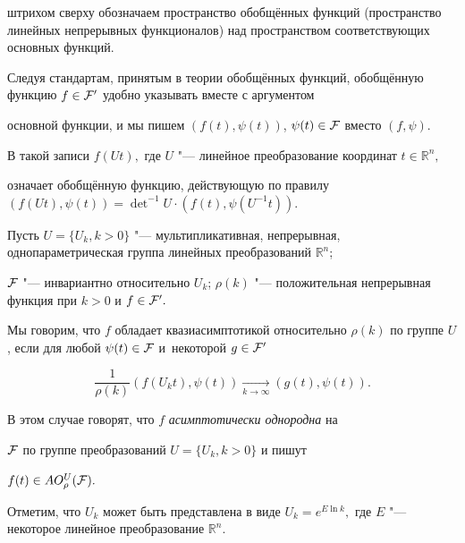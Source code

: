 штрихом сверху обозначаем пространство обобщённых функций (пространство линейных непрерывных функционалов) над пространством соответствующих основных функций.

Следуя стандартам, принятым в теории обобщённых функций, обобщённую функцию $f \in {\cal F}'$ удобно указывать вместе с аргументом

основной функции, и мы пишем $(f(t), \psi(t))$, $\psi(t) \in {\cal F}$ вместо $(f,\psi).$ 

В такой записи $f(Ut),$ где $U$ "--- линейное преобразование координат $t \in \mathbb R^n,$

означает обобщённую функцию, действующую по правилу $(f(Ut),\psi(t))=\det^{-1}  U \cdot (f(t),\psi(U^{-1}t)).$





\smallskip

\begin{definition}[1]

Пусть $U=\{U_k, k>0\}$ "--- мультипликативная, непрерывная, однопараметрическая группа линейных преобразований $\mathbb R^n$; 

${\cal F}$ "--- инвариантно относительно $U_k$; $\rho(k)$ "--- положительная непрерывная функция при $k>0$ и $f \in {\cal F}'.$ 

Мы говорим, что $f$ обладает квазиасимптотикой относительно $\rho(k)$ по группе $U$, если для любой $\psi(t) \in {\cal F}$ и~некоторой $g\in {\cal F}'$

\begin{equation}

\frac1{\rho(k)}(f(U_kt),\psi(t))

\xrightarrow [k\to \infty]{} 

(g(t),\psi(t)).

\label{droz:eq:0.1}

\end{equation}

В этом случае говорят, что $f$ {\it асимптотически однородна} на

$\cal F$ по группе преобразований $U=\{U_k,k>0\}$ и пишут

$f(t)\in AO_{\rho}^U(\cal F).$

\end{definition}



\smallskip



Отметим, что $U_k$ может быть представлена в виде $U_k= e^{E\ln k},$ где $E$ "--- некоторое линейное преобразование $\mathbb R^n.$

